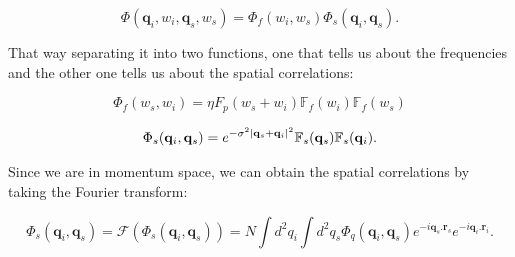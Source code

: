 \documentclass{book}
\begin{document}
\begin{equation}
\Phi(\mathbf{q}_{i},w_{i},\mathbf{q}_{s},w_{s})=\Phi_{f}(w_{i},w_{s})\Phi_{s}(\mathbf{q}_{i},\mathbf{q}_{s}).
\end{equation}

That way separating it into two functions, one that tells us about the frequencies  and the other one tells us about the spatial correlations:

\begin{equation}
\Phi_{f}(w_{s},w_{i})= \eta F_{p}(w_{s}+w_{i}) \mathbb{F}_{f}(w_{i})\mathbb{F}_{f}(w_{s})
\end{equation}

\begin{equation}
 \Phi_{s}(\mathbf{q}_{i},\mathbf{q}_{s})=e^{-\sigma^{2}\abs{\mathbf{q}_{s}+\mathbf{q}_{i}}^{2}}\mathbb{F}_{s}(\mathbf{q}_{s})\mathbb{F}_{s}(\mathbf{q}_{i}).
\end{equation}

Since we are in momentum space, we can obtain the spatial correlations by taking the Fourier transform:

\begin{equation}
\Phi_{s}(\mathbf{q}_{i},\mathbf{q}_{s})=\mathscr{F}(\Phi_{s}(\mathbf{q}_{i},\mathbf{q}_{s}))=N \int d^{2}q_{i} \int d^{2}q_{s} \Phi_{q}(\mathbf{q}_{i},\mathbf{q}_{s}) e^{-i \mathbf{q}_{s}.\mathbf{r}_{s}} e^{-i \mathbf{q}_{i}.\mathbf{r}_{i}}.
\end{equation}
\end{document}
